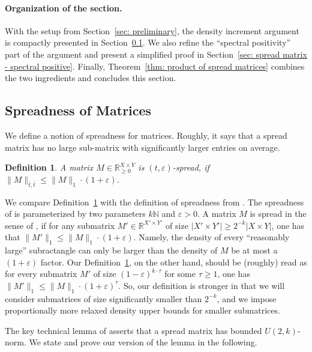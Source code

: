 \documentclass[11pt]{article}
\newtheorem{definition}[theorem]{Definition}
\newcommand{\1}{ \mathbbm{1}}
\newcommand{\eps}{\varepsilon}
\begin{document}
\paragraph*{Organization of the section.} With the setup from Section~\ref{sec: preliminary}, the density increment argument is compactly presented in Section~\ref{sec: spread matrix - sifting}. We also refine the ``spectral positivity'' part of the \cite{KelleyLM2024-nof} argument and present a simplified proof in Section~\ref{sec: spread matrix - spectral positive}. Finally, Theorem~\ref{thm: product of spread matrices} combines the two ingredients and concludes this section.


\subsection{Spreadness of Matrices}\label{sec: spread matrix - sifting}

We define a notion of spreadness for matrices. Roughly, it says that a spread matrix has no large sub-matrix with significantly larger entries on average.

\begin{definition}\label{def:spread matrix}
    A matrix $M\in \mathbb{R}_{\geq 0}^{X\times Y}$ is $(t,\varepsilon)$-spread, if $\|M\|_{\overline{t},\overline{t}} \le \|M\|_1 \cdot (1+\eps)$.
\end{definition}

We compare Definition~\ref{def:spread matrix} with the definition of spreadness from \cite{KelleyLM2024-nof}. The spreadness of \cite{KelleyLM2024-nof} is parameterized by two parameters $k \mathbb{N}$ and $\eps > 0$. A matrix $M$ is spread in the sense of \cite{KelleyLM2024-nof}, if for any submatrix $M'\in \mathbb{R}^{X'\times Y'}$ of size $|X'\times Y'|\ge 2^{-k} | X\times Y|$, one has that $\|M'\|_1 \le \|M\|_1 \cdot (1+\varepsilon)$. Namely, the density of every ``reasonably large'' subractangle can only be larger than the density of $M$ be at most a $(1+\varepsilon)$ factor. Our Definition~\ref{def:spread matrix}, on the other hand, should be (roughly) read as for every submatrix $M'$ of size $(1-\varepsilon)^{k\cdot \tau}$ for some $\tau \ge 1$, one has $\|M'\|_1 \le \|M\|_1\cdot (1+\varepsilon)^{\tau}$. So, our definition is stronger in that we will consider submatrices of size significantly smaller than $2^{-k}$, and we impose proportionally more relaxed density upper bounds for smaller submatrices.

The key technical lemma of \cite{KelleyLM2024-nof} asserts that a spread matrix has bounded $U(2,k)$-norm. We state and prove our version of the lemma in the following.
\end{document}
